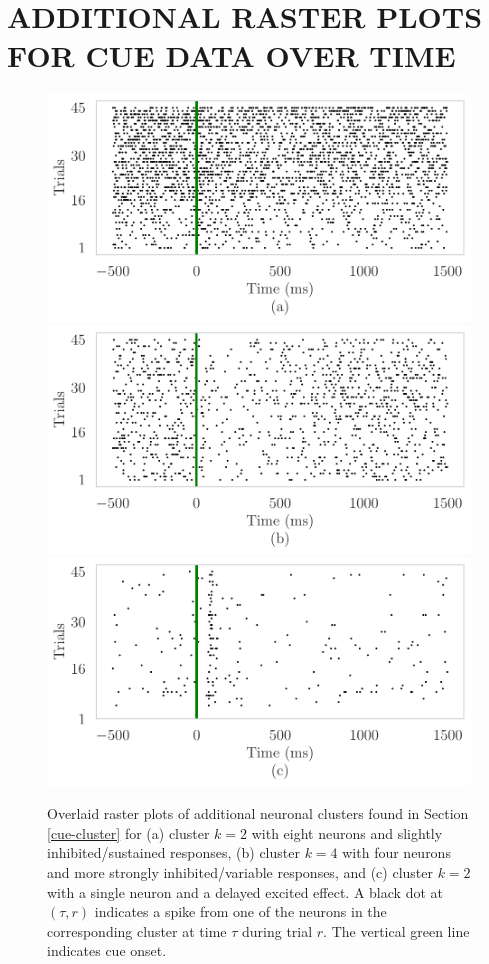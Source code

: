\documentclass[twoside]{article}
\begin{document}
\section{ADDITIONAL RASTER PLOTS FOR CUE DATA OVER TIME} \label{raster-plots}
\begin{figure}[H]
\begin{center}
\includegraphics[scale=0.5]{../img/cue-raster-appa.pdf}
\includegraphics[scale=0.5]{../img/cue-raster-appb.pdf}
\includegraphics[scale=0.5]{../img/cue-raster-appc.pdf}
\end{center}
\vspace{-4mm}
\caption{Overlaid raster plots of additional neuronal clusters found in Section \ref{cue-cluster} for (a) cluster $k =2$ with eight neurons and slightly inhibited/sustained responses, (b) cluster $k = 4$ with four neurons and more strongly inhibited/variable responses, and (c) cluster $k = 2$ with a single neuron and a delayed excited effect.  A black dot at $(\tau, r)$ indicates a spike from one of the neurons in the corresponding cluster at time $\tau$ during trial $r$. The vertical green line indicates cue onset.} \label{cue-rasters-app}
\end{figure}
\end{document}
